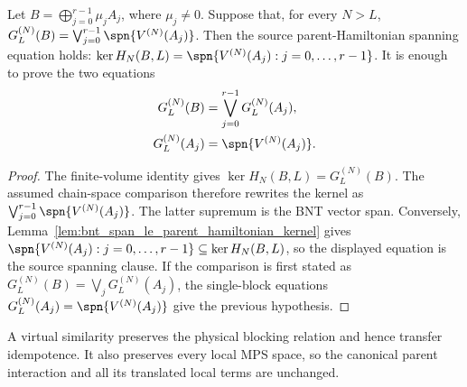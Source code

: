 \begin{lemma}
    \label{lem:block_diagonal_chain_space_comparison_parent_spanning}
    \leanok
    Let $B=\bigoplus_{j=0}^{r-1}\mu_jA_j$, where $\mu_j\ne0$. Suppose that,
    for every $N>L$,
    $G_L^{(N)}(B) =\bigvee_{j=0}^{r-1}\spn\{V^{(N)}(A_j)\}$.
    Then the source parent-Hamiltonian spanning equation holds:
    $\ker H_N(B,L) =\spn\{V^{(N)}(A_j):j=0,\ldots,r-1\}$.
    It is enough to prove the two equations
    \begin{align}
        G_L^{(N)}(B)
         & =\bigvee_{j=0}^{r-1}G_L^{(N)}(A_j), \notag \\
        G_L^{(N)}(A_j)
         & =\spn\{V^{(N)}(A_j)\}. \notag
    \end{align}
\end{lemma}

\begin{proof}
    \leanok
    The finite-volume identity gives
    $\ker H_N(B,L)=G_L^{(N)}(B)$. The assumed chain-space comparison therefore
    rewrites the kernel as
    $\bigvee_{j=0}^{r-1}\spn\{V^{(N)}(A_j)\}$. The latter supremum is the BNT
    vector span. Conversely, Lemma~\ref{lem:bnt_span_le_parent_hamiltonian_kernel}
    gives
    $\spn\{V^{(N)}(A_j):j=0,\ldots,r-1\} \subseteq\ker H_N(B,L)$,
    so the displayed equation is the source spanning clause. If the comparison
    is first stated as $G_L^{(N)}(B)=\bigvee_jG_L^{(N)}(A_j)$, the single-block
    equations $G_L^{(N)}(A_j)=\spn\{V^{(N)}(A_j)\}$ give the previous
    hypothesis.
\end{proof}

\begin{lemma}
    \label{lem:rfp_parent_gauge_invariance}
    \leanok
    A virtual similarity preserves the physical blocking relation and hence
    transfer idempotence. It also preserves every local MPS space, so the
    canonical parent interaction and all its translated local terms are
    unchanged.
\end{lemma}


